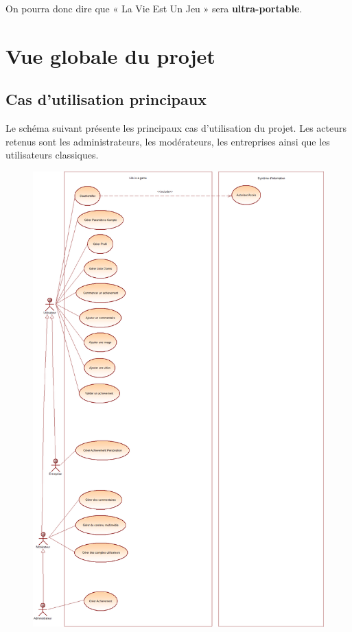 \documentclass{life-fr}
\begin{document}
On pourra donc dire que « La Vie Est Un Jeu » sera \textbf{ultra-portable}.


\chapter{Vue globale du projet}
\section{Cas d'utilisation principaux}

Le schéma suivant présente les principaux cas d'utilisation du projet. Les acteurs retenus sont les administrateurs, les modérateurs, les entreprises ainsi que les utilisateurs classiques.

\newpage

\begin{figure}[H]
  \begin{center}
    \includegraphics[width=15cm]{img/use_case_principaux.png}
  \end{center}
\end{figure}
\end{document}
